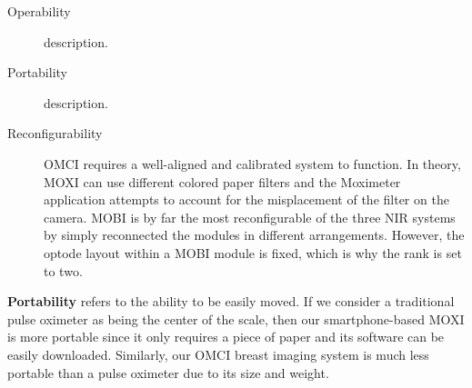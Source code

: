 \begin{description}
   \item[Operability] description.
   \item[Portability] description.
   \item[Reconfigurability] \ac{OMCI} requires a well-aligned and calibrated system to function. In theory, \ac{MOXI} can use different colored paper filters and the Moximeter application attempts to account for the misplacement of the filter on the camera. \ac{MOBI} is by far the most reconfigurable of the three \ac{NIR} systems by simply reconnected the modules in different arrangements. However, the optode layout within a \ac{MOBI} module is fixed, which is why the rank is set to two. 
\end{description}


\textbf{Portability} refers to the ability to be easily moved. If we consider a traditional pulse oximeter as being the center of the scale, then our smartphone-based \ac{MOXI} is more portable since it only requires a piece of paper and its software can be easily downloaded. Similarly, our \ac{OMCI} breast imaging system is much less portable than a pulse oximeter due to its size and weight. 

